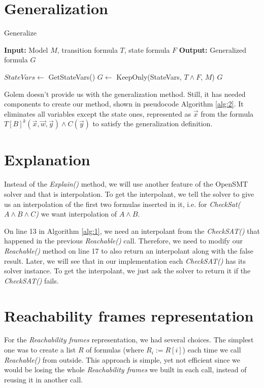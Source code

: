 \newpage
\section*{Generalization}
\begin{algorithm}
    \caption{Generalize}\label{alg:2}
\begin{algorithmic}[1]
\State \textbf{Input:} Model $M$, transition formula $T$, state formula $F$
\State \textbf{Output:} Generalized formula $G$

    \State $StateVars \gets$ GetStateVars()
    \State $G \gets$ KeepOnly(StateVars, $T \wedge F$, $M$)
    \State \Return $G$

\end{algorithmic}
\end{algorithm}
\noindent Golem doesn't provide us with the generalization method. Still, it has needed components to create our method, shown in pseudocode Algorithm \ref{alg:2}. It eliminates all variables except the state ones, represented as $\vec{x}$ from the formula \( T[B]^k(\vec{x}, \vec{w}, \vec{y}) \wedge C(\vec{y}) \) to satisfy the generalization definition.

\section*{Explanation}
\noindent Instead of the \textit{Explain()} method, we will use another feature of the OpenSMT solver and that is interpolation. To get the interpolant, we tell the solver to give us an interpolation of the first two formulas inserted in it, i.e. for \textit{CheckSat($A \wedge B \wedge C$)} we want interpolation of $A \wedge B$. 


On line 13 in Algorithm \ref{alg:1}, we need an interpolant from the \textit{CheckSAT()} that happened in the previous \textit{Reachable()} call. Therefore, we need to modify our \textit{Reachable()} method on line 17 to also return an interpolant along with the false result. Later, we will see that in our implementation each \textit{CheckSAT()} has its solver instance. To get the interpolant, we just ask the solver to return it if the \textit{CheckSAT()} fails.

\section*{Reachability frames representation}
\noindent For the \textit{Reachability frames} representation, we had several choices. The simplest one was to create a list $R$ of formulas (where $R_i := R[i]$) each time we call \textit{Reachable()} from outside. This approach is simple, yet not efficient since we would be losing the whole \textit{Reachability frames} we built in each call, instead of reusing it in another call. 

